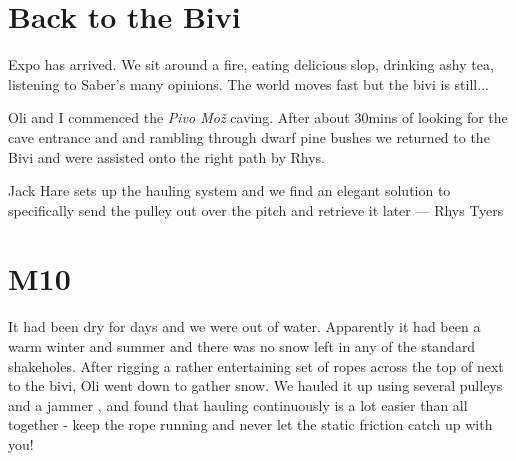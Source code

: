 \section{Back to the Bivi}

\begin{marginfigure}
\end{marginfigure}

Expo has arrived. We sit around a fire, eating delicious slop, drinking ashy tea, listening to Saber's many opinions. The world moves fast but the bivi is still...

Oli and I commenced the \emph{Pivo Mo\v{z}} caving. After about 30mins of looking for the cave entrance and and rambling through dwarf pine bushes we returned to the Bivi and were assisted onto the right path by Rhys.

\begin{marginfigure}
\checkoddpage \ifoddpage \forcerectofloat \else \forceversofloat \fi
\centering
 \caption{Jack Hare sets up the hauling system and we find an elegant solution to specifically send the pulley out over the pitch and retrieve it later --- Rhys Tyers}
 \label{M10haul}
\end{marginfigure}

\section{M10}
It had been dry for days and we were out of water. Apparently it had been a warm winter and summer and there was no snow left in any of the standard shakeholes. After rigging a rather entertaining set of ropes across the top of  next to the bivi, Oli went down to gather snow. We hauled it up using several pulleys and a jammer , and found that hauling continuously is a lot easier than all together - keep the rope running and never let the static friction catch up with you!


